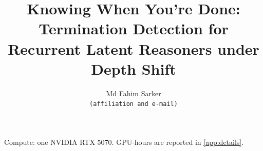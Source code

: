 \documentclass{article}
\title{Knowing When You're Done: Termination Detection for\\Recurrent Latent Reasoners under Depth Shift}
\author{%
  Md Fahim Sarker\\
  \texttt{(affiliation and e-mail)}
}
\theoremstyle{definition}
\theoremstyle{remark}
\begin{document}
\maketitle









\begin{ack}
Compute: one NVIDIA RTX 5070. GPU-hours are reported in \cref{app:details}.
\end{ack}




\appendix






\end{document}

